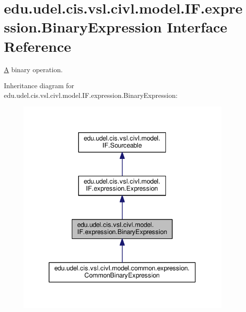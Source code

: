 \hypertarget{interfaceedu_1_1udel_1_1cis_1_1vsl_1_1civl_1_1model_1_1IF_1_1expression_1_1BinaryExpression}{}\section{edu.\+udel.\+cis.\+vsl.\+civl.\+model.\+I\+F.\+expression.\+Binary\+Expression Interface Reference}
\label{interfaceedu_1_1udel_1_1cis_1_1vsl_1_1civl_1_1model_1_1IF_1_1expression_1_1BinaryExpression}


\hyperlink{structA}{A} binary operation.  




Inheritance diagram for edu.\+udel.\+cis.\+vsl.\+civl.\+model.\+I\+F.\+expression.\+Binary\+Expression\+:
\nopagebreak
\begin{figure}[H]
\begin{center}
\leavevmode
\includegraphics[width=306pt]{interfaceedu_1_1udel_1_1cis_1_1vsl_1_1civl_1_1model_1_1IF_1_1expression_1_1BinaryExpression__inherit__graph}
\end{center}
\end{figure}


